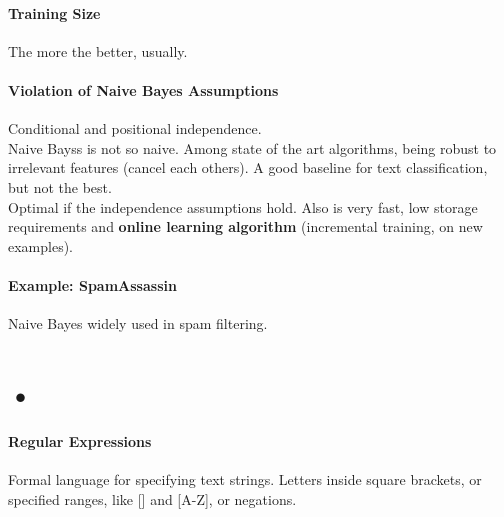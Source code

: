 \documentclass[10pt]{report}
\begin{document}
\paragraph{Training Size} The more the better, usually.
\paragraph{Violation of Naive Bayes Assumptions} Conditional and positional independence.\\
Naive Bayss is not so naive. Among state of the art algorithms, being robust to irrelevant features (cancel each others). A good baseline for text classification, but not the best.\\
Optimal if the independence assumptions hold. Also is very fast, low storage requirements and \textbf{online learning algorithm} (incremental training, on new examples).
\paragraph{Example: SpamAssassin} Naive Bayes widely used in spam filtering.
\section{•}
\paragraph{Regular Expressions}
Formal language for specifying text strings. Letters inside square brackets, or specified ranges, like [] and [A-Z], or negations.
\end{document}
